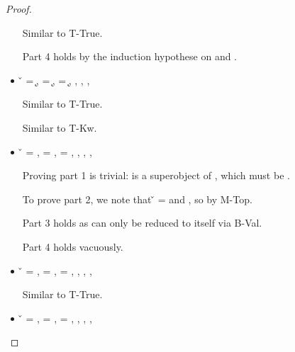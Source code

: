 \begin{lemma}
\begin{proof}
\begin{case}[B-Val]
\begin{itemize}
\begin{subcase}[T-HMap]
        Similar to T-True.

        Part 4 holds by the induction hypothese on {} and {}.
      \end{subcase}
    \item[]
      \begin{subcase}[T-Kw] \v{} = {\k{}},
  \ep{} = {\k{}},
  \e{} = {\k{}},
  \issubtypein{}{\Value{\k{}}}{\t{}},
  \inpropenv{\topprop{}}{\thenprop{\prop{}}},
  \inpropenv{\botprop{}}{\elseprop{\prop{}}},
  \issubtypein{}{\emptyobject{}}{\object{}}

        Similar to T-True.
      \end{subcase}
      \begin{subcase}[T-Str]
        Similar to T-Kw.
      \end{subcase}
  \item[] 
    \begin{subcase}[T-False]
      \v{} = \false{},
\ep{} = \false, 
\e{} = \false, 
\issubtypein{}{\False}{\t{}},
\inpropenv{\botprop{}}{\thenprop{\prop{}}},
\inpropenv{\topprop{}}{\elseprop{\prop{}}},
\issubtypein{}{\emptyobject{}}{\object{}}

Proving part 1 is trivial: \object{} is a superobject of \emptyobject{}, which must be \emptyobject{}. 

To prove part 2, we note that \v{} = \false{}
and \inpropenv{\topprop{}}{\elseprop{\prop{}}}, so \satisfies{\openv{}}{\elseprop{\prop{}}} by M-Top. 

Part 3 holds as \e{} can only be reduced to itself via B-Val.

Part 4 holds vacuously.
\end{subcase}
    \item[]
      \begin{subcase}[T-Class] \v{} = {\class{}},
  \ep{} = {\class{}},
  \e{} = {\class{}},
  \issubtypein{}{\Value{\class{}}}{\t{}},
  \inpropenv{\topprop{}}{\thenprop{\prop{}}},
  \inpropenv{\botprop{}}{\elseprop{\prop{}}},
  \issubtypein{}{\emptyobject{}}{\object{}}

        Similar to T-True.
      \end{subcase}
    \item[]
      \begin{subcase}[T-Instance] \v{} = {\classvalue{\classhint{}} {}},
  \ep{} = {\classvalue{\classhint{}} {\overrightarrow {\classfieldpair{\fld{}} {\v{}}}}},
  \e{} = {\classvalue{\classhint{}} {\overrightarrow {\classfieldpair{\fld{}} {\v{}}}}},
  \issubtypein{}{\class{}}{\t{}},
  \inpropenv{\topprop{}}{\thenprop{\prop{}}},
  \inpropenv{\botprop{}}{\elseprop{\prop{}}},
  \issubtypein{}{\emptyobject{}}{\object{}}



\end{subcase}
\end{itemize}
\end{case}
\end{proof}
\end{lemma}
